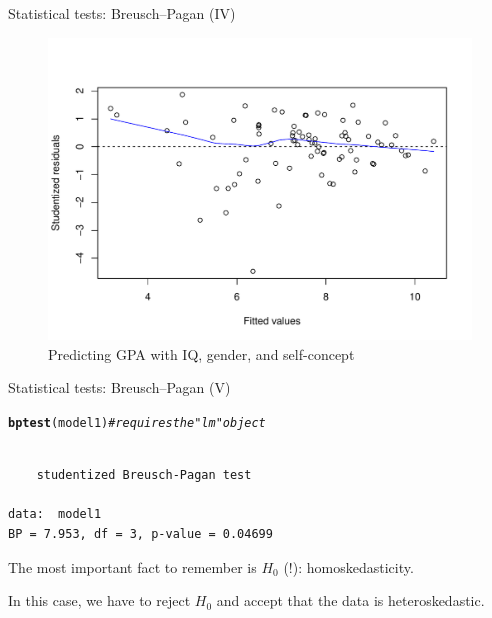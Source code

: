 \documentclass[12pt,english,pdf,xcolor=dvipsnames,aspectratio=169,handout]{beamer}\usepackage[]{graphicx}\usepackage[]{xcolor}
\makeatletter
\newcommand{\hlcom}[1]{\textcolor[rgb]{0.678,0.584,0.686}{\textit{#1}}}%
\newcommand{\hlstd}[1]{\textcolor[rgb]{0.345,0.345,0.345}{#1}}%
\newcommand{\hlkwd}[1]{\textcolor[rgb]{0.737,0.353,0.396}{\textbf{#1}}}%
\newenvironment{kframe}{%
 \def\at@end@of@kframe{}%
 \ifinner\ifhmode%
  \def\at@end@of@kframe{\end{minipage}}%
  \begin{minipage}{\columnwidth}%
 \fi\fi%
 \def\FrameCommand##1{\hskip\@totalleftmargin \hskip-\fboxsep
 \colorbox{shadecolor}{##1}\hskip-\fboxsep
     \hskip-\linewidth \hskip-\@totalleftmargin \hskip\columnwidth}%
 \MakeFramed {\advance\hsize-\width
   \@totalleftmargin\z@ \linewidth\hsize
   \@setminipage}}%
 {\par\unskip\endMakeFramed%
 \at@end@of@kframe}
\newenvironment{knitrout}{}{} %
\makeatother
\begin{document}
\begin{frame}{Statistical tests: Breusch--Pagan (IV)}





\begin{figure}
\centering
\includegraphics[scale=0.5]{../04-graphs/02-04}
\caption{Predicting GPA with IQ, gender, and self-concept}
\end{figure}

\end{frame}



\begin{frame}[fragile]{Statistical tests: Breusch--Pagan (V)}

\begin{knitrout}\footnotesize
{}\color{fgcolor}\begin{kframe}
\begin{alltt}
\hlkwd{bptest}\hlstd{(model1)} \hlcom{# requires the "lm" object}
\end{alltt}
\begin{verbatim}

	studentized Breusch-Pagan test

data:  model1
BP = 7.953, df = 3, p-value = 0.04699
\end{verbatim}
\end{kframe}
\end{knitrout}

The most important fact to remember is $H_0$ (!): homoskedasticity.\bigskip

In this case, we have to reject $H_0$ and accept that the data is heteroskedastic.

\end{frame}
\end{document}
